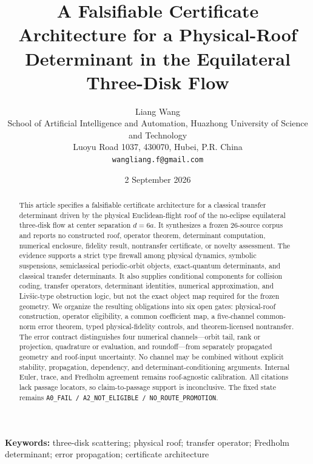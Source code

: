 \documentclass[11pt,a4paper]{article}
\title{A Falsifiable Certificate Architecture for a Physical-Roof Determinant in the Equilateral Three-Disk Flow}
\author{Liang Wang\\
\small School of Artificial Intelligence and Automation, Huazhong University of Science and Technology\\
\small Luoyu Road 1037, 430070, Hubei, P.R. China\\
\small \texttt{wangliang.f@gmail.com}}
\date{2 September 2026}
\begin{document}
\maketitle

\begin{abstract}
This article specifies a falsifiable certificate architecture for a classical transfer determinant driven by the physical Euclidean-flight roof of the no-eclipse equilateral three-disk flow at center separation \(d=6a\). It synthesizes a frozen 26-source corpus and reports no constructed roof, operator theorem, determinant computation, numerical enclosure, fidelity result, nontransfer certificate, or novelty assessment. The evidence supports a strict type firewall among physical dynamics, symbolic suspensions, semiclassical periodic-orbit objects, exact-quantum determinants, and classical transfer determinants. It also supplies conditional components for collision coding, transfer operators, determinant identities, numerical approximation, and Liv\v{s}ic-type obstruction logic, but not the exact object map required for the frozen geometry. We organize the resulting obligations into six open gates: physical-roof construction, operator eligibility, a common coefficient map, a five-channel common-norm error theorem, typed physical-fidelity controls, and theorem-licensed nontransfer. The error contract distinguishes four numerical channels---orbit tail, rank or projection, quadrature or evaluation, and roundoff---from separately propagated geometry and roof-input uncertainty. No channel may be combined without explicit stability, propagation, dependency, and determinant-conditioning arguments. Internal Euler, trace, and Fredholm agreement remains roof-agnostic calibration. All citations lack passage locators, so claim-to-passage support is inconclusive. The fixed state remains \texttt{A0\_FAIL / A2\_NOT\_ELIGIBLE / NO\_ROUTE\_PROMOTION}.
\end{abstract}

\noindent\textbf{Keywords:} three-disk scattering; physical roof; transfer operator; Fredholm determinant; error propagation; certificate architecture
\end{document}
